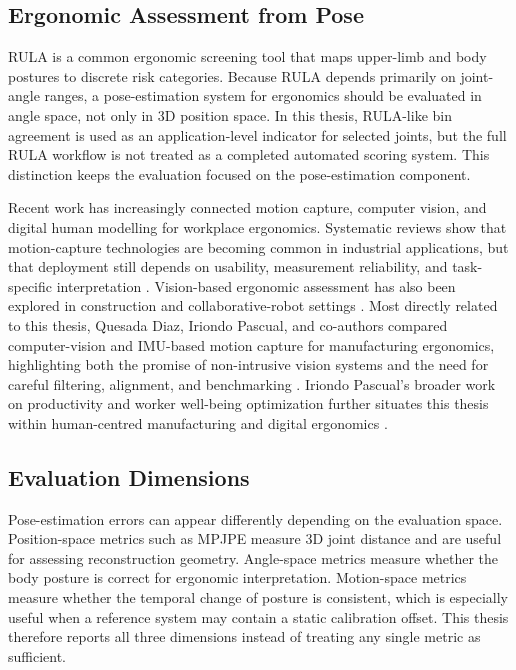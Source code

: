 \documentclass[12pt,a4paper]{article}
\begin{document}
\subsection{Ergonomic Assessment from Pose}

RULA is a common ergonomic screening tool that maps upper-limb and body
postures to discrete risk categories.
Because RULA depends primarily on joint-angle ranges, a pose-estimation system
for ergonomics should be evaluated in angle space, not only in 3D position
space.
In this thesis, RULA-like bin agreement is used as an application-level
indicator for selected joints, but the full RULA workflow is not treated as a
completed automated scoring system.
This distinction keeps the evaluation focused on the pose-estimation component.

Recent work has increasingly connected motion capture, computer vision, and
digital human modelling for workplace ergonomics.
Systematic reviews show that motion-capture technologies are becoming common
in industrial applications, but that deployment still depends on usability,
measurement reliability, and task-specific interpretation
\cite{menolotto2020motion}.
Vision-based ergonomic assessment has also been explored in construction and
collaborative-robot settings \cite{yu2019joint,menanno2024ergonomic}.
Most directly related to this thesis, Quesada Diaz, Iriondo Pascual, and
co-authors compared computer-vision and IMU-based motion capture for
manufacturing ergonomics, highlighting both the promise of non-intrusive
vision systems and the need for careful filtering, alignment, and benchmarking
\cite{quesada2026supporting}.
Iriondo Pascual's broader work on productivity and worker well-being
optimization further situates this thesis within human-centred manufacturing
and digital ergonomics \cite{iriondo2024development,iriondo2025integrating}.

\subsection{Evaluation Dimensions}

Pose-estimation errors can appear differently depending on the evaluation
space.
Position-space metrics such as MPJPE measure 3D joint distance and are useful
for assessing reconstruction geometry.
Angle-space metrics measure whether the body posture is correct for ergonomic
interpretation.
Motion-space metrics measure whether the temporal change of posture is
consistent, which is especially useful when a reference system may contain a
static calibration offset.
This thesis therefore reports all three dimensions instead of treating any
single metric as sufficient.
\end{document}
